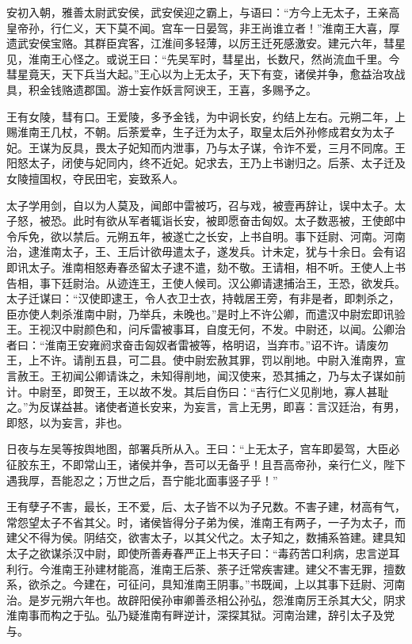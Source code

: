 \documentclass[12pt,UTF8]{ctexbook}
\begin{document}
安初入朝，雅善太尉武安侯，武安侯迎之霸上，与语曰：“方今上无太子，王亲高皇帝孙，行仁义，天下莫不闻。宫车一日晏驾，非王尚谁立者！”淮南王大喜，厚遗武安侯宝赂。其群臣宾客，江淮间多轻薄，以厉王迁死感激安。建元六年，彗星见，淮南王心怪之。或说王曰：“先吴军时，彗星出，长数尺，然尚流血千里。今彗星竟天，天下兵当大起。”王心以为上无太子，天下有变，诸侯并争，愈益治攻战具，积金钱赂遗郡国。游士妄作妖言阿谀王，王喜，多赐予之。



王有女陵，彗有口。王爱陵，多予金钱，为中诇长安，约结上左右。元朔二年，上赐淮南王几杖，不朝。后荼爱幸，生子迁为太子，取皇太后外孙修成君女为太子妃。王谋为反具，畏太子妃知而内泄事，乃与太子谋，令诈不爱，三月不同席。王阳怒太子，闭使与妃同内，终不近妃。妃求去，王乃上书谢归之。后荼、太子迁及女陵擅国权，夺民田宅，妄致系人。



太子学用剑，自以为人莫及，闻郎中雷被巧，召与戏，被壹再辞让，误中太子。太子怒，被恐。此时有欲从军者辄诣长安，被即愿奋击匈奴。太子数恶被，王使郎中令斥免，欲以禁后。元朔五年，被遂亡之长安，上书自明。事下廷尉、河南。河南治，逮淮南太子，王、王后计欲毋遣太子，遂发兵。计未定，犹与十余日。会有诏即讯太子。淮南相怒寿春丞留太子逮不遣，劾不敬。王请相，相不听。王使人上书告相，事下廷尉治。从迹连王，王使人候司。汉公卿请逮捕治王，王恐，欲发兵。太子迁谋曰：“汉使即逮王，令人衣卫士衣，持戟居王旁，有非是者，即刺杀之，臣亦使人刺杀淮南中尉，乃举兵，未晚也。”是时上不许公卿，而遣汉中尉宏即讯验王。王视汉中尉颜色和，问斥雷被事耳，自度无何，不发。中尉还，以闻。公卿治者曰：“淮南王安雍阏求奋击匈奴者雷被等，格明诏，当弃市。”诏不许。请废勿王，上不许。请削五县，可二县。使中尉宏赦其罪，罚以削地。中尉入淮南界，宣言赦王。王初闻公卿请诛之，未知得削地，闻汉使来，恐其捕之，乃与太子谋如前计。中尉至，即贺王，王以故不发。其后自伤曰：“吉行仁义见削地，寡人甚耻之。”为反谋益甚。诸使者道长安来，为妄言，言上无男，即喜：言汉廷治，有男，即怒，以为妄言，非也。



日夜与左吴等按舆地图，部署兵所从入。王曰：“上无太子，宫车即晏驾，大臣必征胶东王，不即常山王，诸侯并争，吾可以无备乎！且吾高帝孙，亲行仁义，陛下遇我厚，吾能忍之；万世之后，吾宁能北面事竖子乎！”



王有孽子不害，最长，王不爱，后、太子皆不以为子兄数。不害子建，材高有气，常怨望太子不省其父。时，诸侯皆得分子弟为侯，淮南王有两子，一子为太子，而建父不得为侯。阴结交，欲害太子，以其父代之。太子知之，数捕系笞建。建具知太子之欲谋杀汉中尉，即使所善寿春严正上书天子曰：“毒药苦口利病，忠言逆耳利行。今淮南王孙建材能高，淮南王后荼、荼子迁常疾害建。建父不害无罪，擅数系，欲杀之。今建在，可征问，具知淮南王阴事。”书既闻，上以其事下廷尉、河南治。是岁元朔六年也。故辟阳侯孙审卿善丞相公孙弘，怨淮南厉王杀其大父，阴求淮南事而构之于弘。弘乃疑淮南有畔逆计，深探其狱。河南治建，辞引太子及党与。
\end{document}
